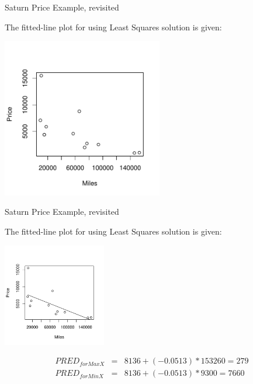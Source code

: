 \documentclass[14pt]{beamer}\usepackage[]{graphicx}\usepackage[]{color}
\begin{document}
\begin{frame}[fragile]{Saturn Price Example, revisited}

{\small{
The fitted-line plot for using Least Squares solution is given:
}}

\vspace{-6mm}


\includegraphics[width=7cm]{figure/LBL14a-1} 


\end{frame}

\begin{frame}[fragile]{Saturn Price Example, revisited}

{\small{
The fitted-line plot for using Least Squares solution is given:
}}



\includegraphics[width=4.5cm]{figure/LBL14b-1} 


\vspace{-3mm}

{\footnotesize{
\begin{eqnarray*}
  PRED_{forMaxX} &=& 8136 + (-0.0513) * 153260 = 279 \\
  PRED_{forMinX} &=& 8136 + (-0.0513) * 9300 = 7660
\end{eqnarray*}
}}

\end{frame}
\end{document}
